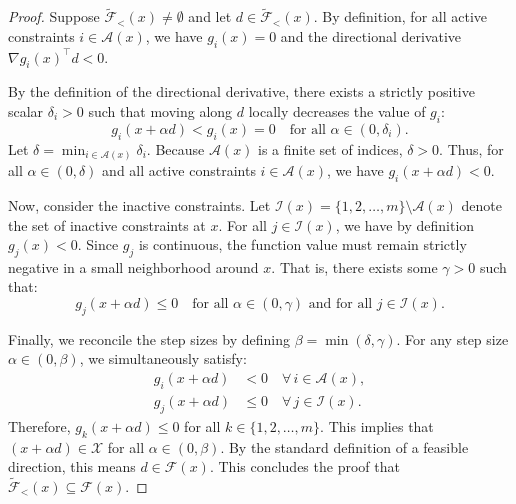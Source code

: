 \documentclass[11pt]{article}
\theoremstyle{definition}
\theoremstyle{plain}
\theoremstyle{remark}
\begin{document}
\begin{proof}
  Suppose $\widetilde{\mathcal{F}}_{<}(x) \neq \emptyset$ and let $d \in \widetilde{\mathcal{F}}_{<}(x)$. By definition, for all active constraints $i \in \mathcal{A}(x)$, we have $g_i(x) = 0$ and the directional derivative $\nabla g_i(x)^\top d < 0$.
  
  By the definition of the directional derivative, there exists a strictly positive scalar $\delta_i > 0$ such that moving along $d$ locally decreases the value of $g_i$:
  \[
    g_i(x + \alpha d) < g_i(x) = 0 \quad \text{for all } \alpha \in (0, \delta_i).
  \]
  Let $\delta = \min_{i \in \mathcal{A}(x)} \delta_i$. Because $\mathcal{A}(x)$ is a finite set of indices, $\delta > 0$. Thus, for all $\alpha \in (0, \delta)$ and all active constraints $i \in \mathcal{A}(x)$, we have $g_i(x + \alpha d) < 0$.
  
  Now, consider the inactive constraints. Let $\mathcal{I}(x) = \{1, 2, \dots, m\} \setminus \mathcal{A}(x)$ denote the set of inactive constraints at $x$. For all $j \in \mathcal{I}(x)$, we have by definition $g_j(x) < 0$. Since $g_j$ is continuous, the function value must remain strictly negative in a small neighborhood around $x$. That is, there exists some $\gamma > 0$ such that:
  \[
    g_j(x + \alpha d) \leq 0 \quad \text{for all } \alpha \in (0, \gamma) \text{ and for all } j \in \mathcal{I}(x).
  \]
  
  Finally, we reconcile the step sizes by defining $\beta = \min(\delta, \gamma)$. For any step size $\alpha \in(0, \beta)$, we simultaneously satisfy:
  \begin{align*}
    g_i(x + \alpha d) &< 0 \quad \forall\, i \in \mathcal{A}(x), \\
    g_j(x + \alpha d) &\leq 0 \quad \forall\, j \in \mathcal{I}(x).
  \end{align*}
  Therefore, $g_k(x + \alpha d) \leq 0$ for all $k \in \{1, 2, \dots, m\}$. This implies that $(x + \alpha d) \in \mathcal{X}$ for all $\alpha \in (0, \beta)$. By the standard definition of a feasible direction, this means $d \in \mathcal{F}(x)$. This concludes the proof that $\widetilde{\mathcal{F}}_{<}(x) \subseteq \mathcal{F}(x)$.
\end{proof}
\end{document}
